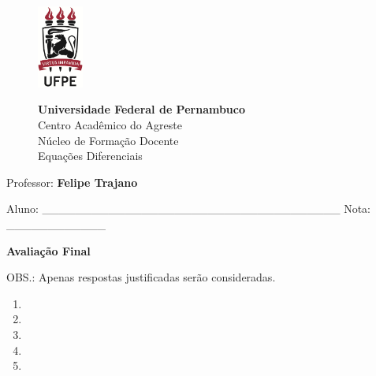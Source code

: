 \documentclass[12pt]{report}
\begin{document}
\thispagestyle{empty}

\begin{figure}[ht]
\hspace{0.5cm}
\begin{minipage}[b]{0.11\linewidth}
\centering
\includegraphics[width=1.5cm]{logoufpe.jpg}
\end{minipage}
\hspace{0.5cm}
\begin{minipage}[b]{0.75\linewidth}
\centering
\large\textbf{Universidade Federal de Pernambuco}\\
Centro Acad\^emico do Agreste	\\
N\'ucleo de Forma\c{c}\~ao Docente\\
Equa\c{c}\~oes Diferenciais
\end{minipage}
\end{figure}
Professor: \textbf{Felipe Trajano}
\vspace{0.2cm}

Aluno: \_\_\_\_\_\_\_\_\_\_\_\_\_\_\_\_\_\_\_\_\_\_\_\_\_\_\_\_\_\_\_\_\_\_\_\_  Nota: \_\_\_\_\_\_\_\_\_\_\_\_
\vspace{0.2cm}
\begin{center}
\textbf{Avalia\c{c}\~ao Final}
\end{center}

OBS.: Apenas respostas justificadas ser\~ao consideradas.

\vspace{0.2cm}
\normalsize

\begin{enumerate}

\item 


\item 


\item 


\item 


\item 


\end{enumerate}
\end{document}
